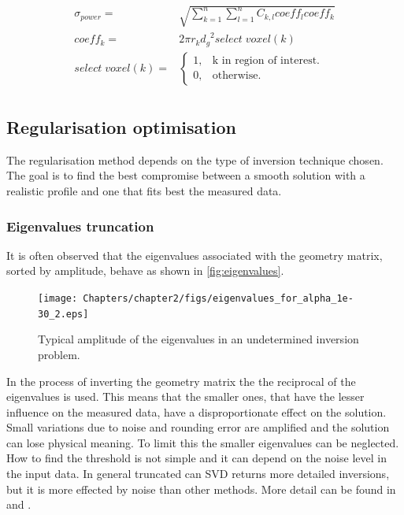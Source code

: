\begin{equation}
\label{eq:Bayesian4}
\begin{aligned}
\sigma_{power} =& \sqrt{ \sum_{k=1}^{n} \sum_{l=1}^{n} C_{k,l} coeff_{l} coeff_{k}} \\
coeff_{k} =& 2\pi r_k {d_g}^2 select \; voxel(k) \\
select \; voxel(k) =& \begin{cases}
    1, & \text{k in region of interest}.\\
    0, & \text{otherwise}.
    \end{cases} \\
\end{aligned}
\end{equation}





\subsection{Regularisation optimisation}\label{Regularisation_optimisation}
The regularisation method depends on the type of inversion technique chosen. The goal is to find the best compromise between a smooth solution with a realistic profile and one that fits best the measured data.
\subsubsection{Eigenvalues truncation}
It is often observed that the eigenvalues associated with the geometry matrix, sorted by amplitude, behave as shown in \autoref{fig:eigenvalues}.

\begin{figure}
	\centering
	\texttt{[image: Chapters/chapter2/figs/eigenvalues\_for\_alpha\_1e-30\_2.eps]}
	\caption{Typical amplitude of the eigenvalues in an undetermined inversion problem.}
	\label{fig:eigenvalues}
\end{figure}

In the process of inverting the geometry matrix the the reciprocal of the eigenvalues is used. This means that the smaller ones, that have the lesser influence on the measured data, have a disproportionate effect on the solution. Small variations due to noise and rounding error are amplified and the solution can lose physical meaning. To limit this the smaller eigenvalues can be neglected. How to find the threshold is not simple and it can depend on the noise level in the input data. In general truncated can SVD returns more detailed inversions, but it is more effected by noise than other methods. More detail can be found in \cite{Schou2015} and \cite{Widman2002}.

